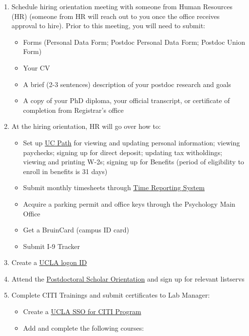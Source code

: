 \documentclass[
]{book}
\providecommand{\tightlist}{%
  \setlength{\itemsep}{0pt}\setlength{\parskip}{0pt}}
\begin{document}
\begin{enumerate}
\def\labelenumi{\arabic{enumi}.}
\item
  Schedule hiring orientation meeting with someone from Human Resources (HR) (someone from HR will reach out to you once the office receives approval to hire). Prior to this meeting, you will need to submit:

  \begin{itemize}
  \tightlist
  \item
    Forms (Personal Data Form; Postdoc Personal Data Form; Postdoc Union Form)
  \item
    Your CV
  \item
    A brief (2-3 sentences) description of your postdoc research and goals
  \item
    A copy of your PhD diploma, your official transcript, or certificate of completion from Registrar's office
  \end{itemize}
\item
  At the hiring orientation, HR will go over how to:

  \begin{itemize}
  \tightlist
  \item
    Set up \href{https://ucpath.universityofcalifornia.edu/}{UC Path} for viewing and updating personal information; viewing paychecks; signing up for direct deposit; updating tax witholdings; viewing and printing W-2s; signing up for Benefits (period of eligibility to enroll in benefits is 31 days)
  \item
    Submit monthly timesheets through \href{https://uctrs.it.ucla.edu/}{Time Reporting System}
  \item
    Acquire a parking permit and office keys through the Psychology Main Office
  \item
    Get a BruinCard (campus ID card)
  \item
    Submit I-9 Tracker
  \end{itemize}
\item
  Create a \href{https://accounts.iam.ucla.edu/\#/}{UCLA logon ID}
\item
  Attend the \href{https://www.postdoc.ucla.edu/resources/new-postdocs/}{Postdoctoral Scholar Orientation} and sign up for relevant listservs
\item
  Complete CITI Trainings and submit certificates to Lab Manager:

  \begin{itemize}
  \tightlist
  \item
    Create a \href{http://ora.research.ucla.edu/OHRPP/Documents/Education/SSO_CITI_New_Acct.pdf}{UCLA SSO for CITI Program}
  \item
    Add and complete the following courses:


\end{itemize}
\end{enumerate}
\end{document}
